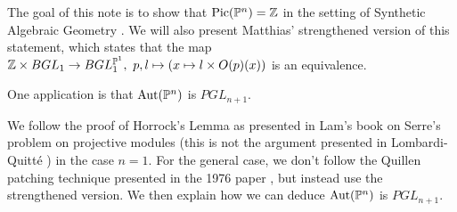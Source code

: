 The goal of this note is to show that $\mathrm{Pic}(\mathbb{P}^n) = \mathbb{Z}$ in the setting of Synthetic Algebraic
Geometry \cite{SAG}.
We will also present Matthias' strengthened version of this statement, which states that the
map $\mathbb{Z}\times BGL_1\rightarrow BGL_1^{\mathbb{P}^1},~p,l\mapsto (x\mapsto l\times O(p)(x))$
is an equivalence.

One application is that $\mathrm{Aut}(\mathbb{P}^n)$ is $PGL_{n+1}$.

We follow the proof of Horrock's Lemma as presented in Lam's book on Serre's problem \cite{Lam}
on projective modules (this is not the argument presented in Lombardi-Quitt\'e \cite{LQ})
in the case $n=1$. For the general case, we don't follow the Quillen patching technique
presented in the 1976 paper \cite{Quillen}, but instead use the strengthened version.
We then explain how we can deduce $\mathrm{Aut}(\mathbb{P}^n)$ is $PGL_{n+1}$.

